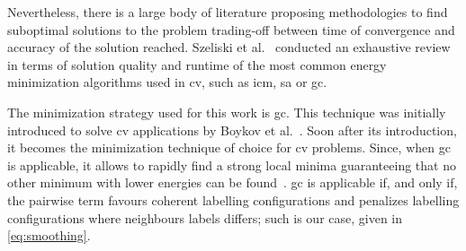 Nevertheless, there is a large body of literature proposing methodologies to find suboptimal solutions to the problem trading-off between time of convergence and accuracy of the solution reached.
Szeliski et al.~\cite{szeliski2008comparative} conducted an exhaustive review in terms of solution quality and runtime of the most common energy minimization algorithms used in \ac{cv}, such as \ac{icm}, \ac{sa} or \ac{gc}.

The minimization strategy used for this work is \ac{gc}. 
This technique was initially introduced to solve \ac{cv} applications by Boykov et al.~\cite{boykov2001fast}.
Soon after its introduction, it becomes the minimization technique of choice for \ac{cv} problems.
Since, when \ac{gc} is applicable, it allows to rapidly find a strong local minima guaranteeing that no other minimum with lower energies can be found~\cite{delong2012fast}. 
\ac{gc} is applicable if, and only if, the pairwise term favours coherent labelling configurations and penalizes labelling configurations where neighbours labels differs; 
such is our case, given in \cref{eq:smoothing}.



